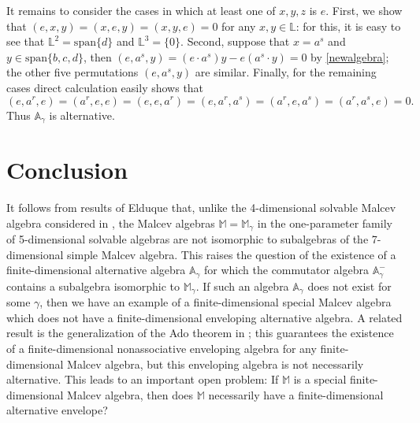 \documentclass{amsart}
\theoremstyle{plain}
\theoremstyle{definition}
\begin{document}
It remains to consider the cases in which at least one of $x, y, z$ is $e$.
First, we show that $(e,x,y) = (x,e,y) = (x,y,e) = 0$ for any $x, y \in
\mathbb{L}$: for this, it is easy to see that $\mathbb{L}^2 =
\mathrm{span}\{d\}$ and $\mathbb{L}^3 = \{0\}$. Second, suppose that $x = a^s$
and $y \in \mathrm{span}\{b,c,d\}$, then $(e, a^s, y)= (e \cdot a^s) y - e (a^s
\cdot y) = 0$ by \eqref{newalgebra}; the other five permutations $( e, a^s, y
)$ are similar. Finally, for the remaining cases direct calculation easily
shows that
  \[
 (e, a^r, e) = (a^r, e, e) = (e, e, a^r) =
 (e, a^r, a^s) = (a^r, e, a^s) = (a^r, a^s, e) = 0.
  \]
Thus $\mathbb{A}_\gamma$ is alternative.


\section{Conclusion}

It follows from results of Elduque \cite{Elduque} that, unlike the
4-dimensional solvable Malcev algebra considered in \cite{BHPU}, the Malcev
algebras $\mathbb{M} = \mathbb{M}_\gamma$ in the one-parameter family of
5-dimensional solvable algebras are not isomorphic to subalgebras of the
7-dimensional simple Malcev algebra. This raises the question of the existence
of a finite-dimensional alternative algebra $\mathbb{A}_\gamma$ for which the
commutator algebra $\mathbb{A}_\gamma^-$ contains a subalgebra isomorphic to
$\mathbb{M}_\gamma$.  If such an algebra $\mathbb{A}_\gamma$ does not exist for
some $\gamma$, then we have an example of a finite-dimensional special Malcev
algebra which does not have a finite-dimensional enveloping alternative
algebra.  A related result is the generalization of the Ado theorem in
\cite{PerezIzquierdoShestakov}; this guarantees the existence of a
finite-dimensional nonassociative enveloping algebra for any finite-dimensional
Malcev algebra, but this enveloping algebra is not necessarily alternative.
This leads to an important open problem: If $\mathbb{M}$ is a special
finite-dimensional Malcev algebra, then does $\mathbb{M}$ necessarily have a
finite-dimensional alternative envelope?
\end{document}
